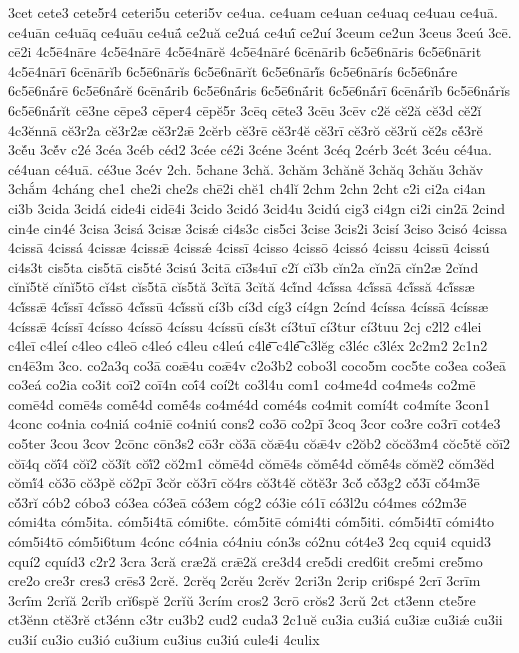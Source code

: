 {3cet
cete3
cete5r4
ceteri5u
ceteri5v
ce4ua.
ce4uam
ce4uan
ce4uaq
ce4uau
ce4uā.
ce4uān
ce4uāq
ce4uāu
ce4uā́
ce2uă
ce2uá
ce4uī́
ce2uí
3ceum
ce2un
3ceus
3ceú
3cē.
cē2i
4c5ē4nāre
4c5ē4nārē
4c5ē4nārĕ
4c5ē4nāré
6cēnārib
6c5ē6nāris
6c5ē6nārit
4c5ē4nārī
6cēnārĭb
6c5ē6nārĭs
6c5ē6nārĭt
6c5ē6nārĭ́s
6c5ē6nārís
6c5ē6nā́re
6c5ē6nā́rē
6c5ē6nā́rĕ
6cēnā́rib
6c5ē6nā́ris
6c5ē6nā́rit
6c5ē6nā́rī
6cēnā́rĭb
6c5ē6nā́rĭs
6c5ē6nā́rĭt
cē3ne
cēpe3
cēper4
cēpĕ5r
3cēq
cēte3
3cēu
3cēv
c2ĕ
cĕ2ă
cĕ3d
cĕ2ĭ
4c3ĕnnā
cĕ3r2a
cĕ3r2æ
cĕ3r2ǣ
2cĕrb
cĕ3rē
cĕ3r4ĕ
cĕ3rī
cĕ3rŏ
cĕ3rŭ
cĕ2s
cĕ́3rĕ
3cĕ́u
3cĕ́v
c2é
3céa
3céb
céd2
3cée
cé2i
3céne
3cént
3céq
2cérb
3cét
3céu
cé4ua.
cé4uan
cé4uā.
cé3ue
3cév
2ch.
5chane
3chă.
3chăm
3chănĕ
3chăq
3chău
3chăv
3chắm
4cháng
che1
che2i
che2s
chē2i
chĕ1
ch4lĭ
2chm
2chn
2cht
c2i
ci2a
ci4an
ci3b
3cida
3cidá
cide4i
cidē4i
3cido
3cidó
3cid4u
3cidú
cig3
ci4gn
ci2i
cin2ā
2cind
cin4e
cin4é
3cisa
3cisá
3cisæ
3cisǽ
ci4s3c
cis5ci
3cise
3cis2i
3cisí
3ciso
3cisó
4cissa
4cissā
4cissá
4cissæ
4cissǣ
4cissǽ
4cissī
4cisso
4cissō
4cissó
4cissu
4cissū
4cissú
ci4s3t
cis5ta
cis5tā
cis5té
3cisú
3citā
cī3s4uī
c2ĭ
cĭ3b
cĭn2a
cĭn2ā
cĭn2æ
2cĭnd
cĭnĭ5tĕ
cĭnĭ5tō
cĭ4st
cĭs5tā
cĭs5tă
3cĭtā
3cĭtă
4cĭ́nd
4cĭ́ssa
4cĭ́ssā
4cĭ́ssă
4cĭ́ssæ
4cĭ́ssǣ
4cĭ́ssī
4cĭ́ssō
4cĭ́ssū
4cĭ́ssŭ
cí3b
cí3d
cíg3
cí4gn
2cínd
4císsa
4císsā
4císsæ
4císsǣ
4císsī
4císso
4císsō
4císsu
4císsū
cís3t
cí3tuī
cí3tur
cí3tuu
2cj
c2l2
c4lei
c4leī
c4leí
c4leo
c4leō
c4leó
c4leu
c4leú
c4le͞
c4le͡
c3lĕg
c3léc
c3léx
2c2m2
2c1n2
cn4ē3m
3co.
co2a3q
co3ā
coǣ4u
coǣ4v
c2o3b2
cobo3l
coco5m
coc5te
co3ea
co3eā
co3eá
co2ia
co3it
coī2
coī4n
coī́4
coí2t
co3l4u
com1
co4me4d
co4me4s
co2mē
comē4d
comē4s
comḗ4d
comḗ4s
co4mé4d
comé4s
co4mit
comí4t
co4míte
3con1
4conc
co4nia
co4niá
co4niē
co4niú
cons2
co3ō
co2pī
3coq
3cor
co3re
co3rī
cot4e3
co5ter
3cou
3cov
2cōnc
cōn3s2
cō3r
cŏ3ā
cŏǣ4u
cŏǣ4v
c2ŏb2
cŏcŏ3m4
cŏc5tĕ
cŏī2
cŏī4q
cŏī́4
cŏĭ2
cŏ3ĭt
cŏĭ́2
cŏ2m1
cŏmē4d
cŏmē4s
cŏmḗ4d
cŏmḗ4s
cŏmĕ2
cŏm3ĕd
cŏmĭ́4
cŏ3ō
cŏ3pĕ
cŏ2pī
3cŏr
cŏ3rī
cŏ4rs
cŏ3t4ĕ
cŏtĕ3r
3cŏ́
cŏ́3g2
cŏ́3ī
cŏ́4m3ē
cŏ́3rĭ
cób2
cóbo3
có3ea
có3eā
có3em
cóg2
có3ie
có1ī
có3l2u
có4mes
có2m3ē
cómi4ta
cóm5ita.
cóm5i4tā
cómi6te.
cóm5itē
cómi4ti
cóm5iti.
cóm5i4tī
cómi4to
cóm5i4tō
cóm5i6tum
4cónc
có4nia
có4niu
cón3s
có2nu
cót4e3
2cq
cqui4
cquid3
cquí2
cquíd3
c2r2
3cra
3cră
cræ2ă
crǣ2ă
cre3d4
cre5di
cred6it
cre5mi
cre5mo
cre2o
cre3r
cres3
crēs3
2crĕ.
2crĕq
2crĕu
2crĕv
2cri3n
2crip
cri6spé
2crī
3crīm
3crī́m
2crĭă
2crĭb
crĭ6spĕ
2crĭŭ
3crím
cros2
3crō
crŏs2
3crŭ
2ct
ct3enn
cte5re
ct3ĕnn
ctĕ3rĕ
ct3énn
c3tr
cu3b2
cud2
cuda3
2c1uĕ
cu3ia
cu3iá
cu3iæ
cu3iǽ
cu3ii
cu3ií
cu3io
cu3ió
cu3ium
cu3ius
cu3iú
cule4i
4culix
}
